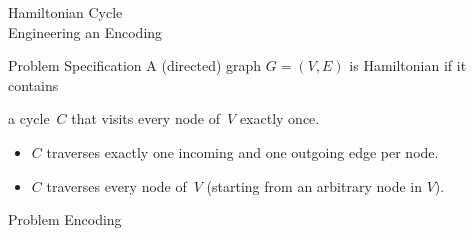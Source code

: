 \begin{frame}{Hamiltonian Cycle\\
  \normalsize Engineering an Encoding}
  \begin{block}{Problem Specification}
  A (directed) graph $G=(V,E)$ is Hamiltonian if it contains

  \alert<1>{a cycle~$C$ that visits every node of~$V$ exactly once}.
  \end{block}
\pause
  \begin{itemize}
  \item[\ithand] $C$ traverses \alert<3-4>{exactly} \alert<3>{one incoming} and \alert<4>{one outgoing} \alert<3-4>{edge per node}.
  \item[\ithand] $C$ \alert<5>{traverses} \alert<8>{every node} of~$V$ (\alert<7>{starting from an arbitrary node} in $V$).
  \end{itemize}
\pause
  \begin{block}{Problem Encoding}
  \begin{semiverbatim}
  \end{semiverbatim}
  \begin{semiverbatim}
  \end{semiverbatim}
  \end{block}
\end{frame}
